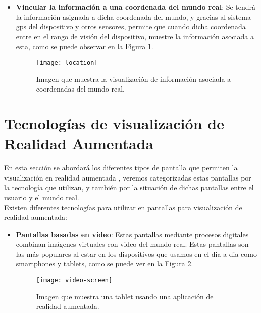 \begin{itemize}
\begin{itemize}
\begin{itemize}
  \item \textbf{Vincular la información a una coordenada del mundo real}: Se tendrá la información asignada a dicha coordenada del mundo, y gracias al sistema gps del dispositivo y otros sensores, permite que cuando dicha coordenada entre en el rango de visión del dispositivo, muestre la información asociada a esta, como se puede observar en la Figura \ref{figura-location}.

  \begin{figure}[h]
    \centering
    \texttt{[image: location]}
    \caption{Imagen que muestra la visualización de información asociada a coordenadas del mundo real.\protect\footnotemark}
    \label{figura-location}
  \end{figure}


\end{itemize}

\section{Tecnologías de visualización de Realidad Aumentada}
En esta sección se abordará los diferentes tipos de pantalla que permiten la visualización en realidad aumentada \cite{billinghurst}, veremos categorizadas estas pantallas por la tecnología que utilizan, y también por la situación de dichas pantallas entre el usuario y el mundo real.\\

Existen diferentes tecnologías para utilizar en pantallas para visualización de realidad aumentada:
\begin{itemize}
  \item \textbf{Pantallas basadas en video}: Estas pantallas mediante procesos digitales combinan imágenes virtuales con video del mundo real. Estas pantallas son las más populares al estar en los dispositivos que usamos en el dia a dia como smartphones y tablets, como se puede ver en la Figura \ref{figura-pantalla-video}.

  \begin{figure}[h]
    \centering
    \texttt{[image: video-screen]}
    \caption{Imagen que muestra una tablet usando una aplicación de realidad aumentada.\protect\footnotemark}
    \label{figura-pantalla-video}
  \end{figure}



\end{itemize}
\end{itemize}
\end{itemize}
